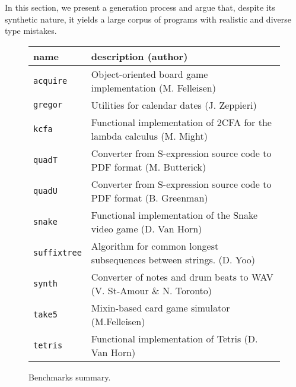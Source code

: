 
In this section, we
present a generation process and argue that, despite its synthetic
nature, it yields a large corpus of programs with  realistic and diverse type mistakes.


\begin{figure}
\begin{tabular}{p{1.75cm} | p{6cm} }
  {\bf  name} & {\bf description (author)}  \\

\hline

  \texttt{acquire} & Object-oriented board game implementation (M. Felleisen)  \\%


\hline
  \texttt{gregor} & Utilities for calendar dates (J. Zeppieri) \\%


\hline
  \texttt{kcfa} & Functional implementation of 2CFA for the lambda calculus (M. Might) \\%


\hline
  \texttt{quadT} & Converter from S-expression source code to PDF format (M. Butterick)\\%

\hline
  \texttt{quadU} & Converter from S-expression source code to PDF format  (B. Greenman) \\%

\hline
  \texttt{snake} & Functional implementation of the  Snake video game (D. Van Horn) \\%

\hline
  \texttt{suffixtree} & Algorithm for common longest subsequences between strings. (D. Yoo) \\%

\hline
  \texttt{synth} & Converter of notes and drum beats to WAV (V. St-Amour \& N. Toronto) \\%

\hline
  \texttt{take5} & Mixin-based card game simulator (M.Felleisen)  \\%

\hline
  \texttt{tetris} & Functional implementation of Tetris (D. Van Horn) \\%


\end{tabular}
  \caption{Benchmarks summary.}
  \label{table:benchmark-descriptions}
\end{figure}


